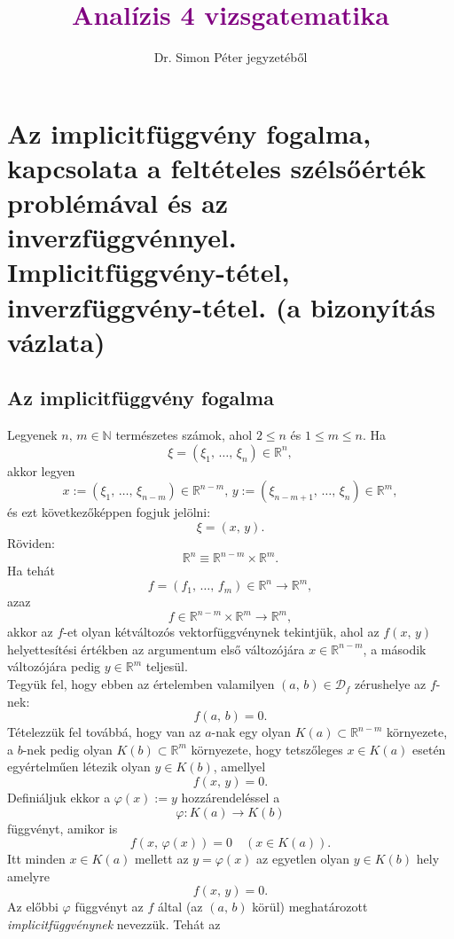 \documentclass[12pt]{article}
\title{\textcolor{purple}{\Huge\textbf{Analízis 4 vizsgatematika}}}
\author{Dr. Simon Péter jegyzetéből}
\date{}
\newcommand{\R}{\mathbb{R}}
\newcommand{\N}{\mathbb{N}}
\newcommand{\D}{\mathcal{D}_f}
\begin{document}
    \maketitle
    \tableofcontents
    \newpage
    
    \section{Az implicitfüggvény fogalma, kapcsolata a feltételes szélsőérték problémával és az inverzfüggvénnyel. Implicitfüggvény-tétel, inverzfüggvény-tétel. (a bizonyítás vázlata)}
    \subsection{Az implicitfüggvény fogalma}
    Legyenek $n, \, m \in \N$ természetes számok, ahol $2 \leq n$ és $1 \leq m \leq n$. Ha
    \[
        \xi = (\xi_1, \, \dots, \, \xi_n) \in \R^n,
    \]
    akkor legyen
    \[
        x := (\xi_1, \, \dots, \, \xi_{n-m}) \in \R^{n-m}, \, y := (\xi_{n-m+1}, \, \dots, \, \xi_n) \in \R^m,
    \]
    és ezt következőképpen fogjuk jelölni:
    \[
        \xi = (x, \, y).
    \]
    Röviden:
    \[
        \R^n \equiv \R^{n-m} \times \R^{m}.
    \]
    Ha tehát
    \[
        f = (f_1, \, \dots, \, f_m) \in \R^n \to \R^m,
    \]
    azaz
    \[
        f \in \R^{n-m} \times \R^m \to \R^m,
    \]
    akkor az $f$-et olyan kétváltozós vektorfüggvénynek tekintjük, ahol az $f(x, \, y)$ helyettesítési értékben az argumentum első változójára $x \in \R^{n-m}$, a második változójára pedig $y \in \R^m$ teljesül.\\

    Tegyük fel, hogy ebben az értelemben valamilyen $(a, \, b) \in \D$ zérushelye az $f$-nek:
    \[
        f(a, \, b) = 0.
    \]
    Tételezzük fel továbbá, hogy van az $a$-nak egy olyan $K(a) \subset \R^{n-m}$ környezete, a $b$-nek pedig olyan $K(b) \subset \R^m$ környezete, hogy tetszőleges $x \in K(a)$ esetén egyértelműen létezik olyan $y \in K(b)$, amellyel
    \[
        f(x, \, y) = 0.
    \]
    Definiáljuk ekkor a $\varphi(x) := y$ hozzárendeléssel a
    \[
        \varphi : K(a) \to K(b)
    \]
    függvényt, amikor is
    \[
        f(x, \, \varphi(x)) = 0 \quad (x \in K(a)).
    \]
    Itt minden $x \in K(a)$ mellett az $y = \varphi(x)$ az egyetlen olyan $y \in K(b)$ hely amelyre
    \[
        f(x, \, y) = 0.
    \]
    Az előbbi $\varphi$ függvényt az $f$ által (az $(a, \, b)$ körül) meghatározott \textit{implicitfüggvénynek} nevezzük. Tehát az
    
\end{document}
